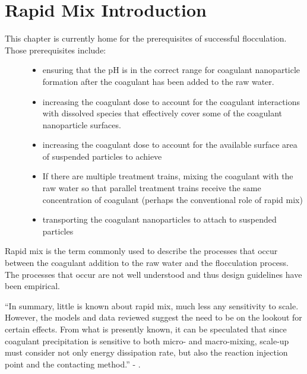 \documentclass[letterpaper,10pt,english]{sphinxmanual}
\begin{document}
\chapter{Rapid Mix Introduction}
\label{\detokenize{Rapid_Mix/RM_Intro:rapid-mix-introduction}}\label{\detokenize{Rapid_Mix/RM_Intro:title-rapid-mix-introduction}}\label{\detokenize{Rapid_Mix/RM_Intro::doc}}\begin{description}
\item[{This chapter is currently home for the prerequisites of successful flocculation. Those prerequisites include:}] \leavevmode\begin{itemize}
\item {} 
ensuring that the pH is in the correct range for coagulant nanoparticle formation after the coagulant has been added to the raw water.

\item {} 
increasing the coagulant dose to account for the coagulant interactions with dissolved species that effectively cover some of the coagulant nanoparticle surfaces.

\item {} 
increasing the coagulant dose to account for the available surface area of suspended particles to achieve

\item {} 
If there are multiple treatment trains, mixing the coagulant with the raw water so that parallel treatment trains receive the same concentration of coagulant (perhaps the conventional role of rapid mix)

\item {} 
transporting the coagulant nanoparticles to attach to suspended particles

\end{itemize}

\end{description}

Rapid mix is the term commonly used to describe the processes that occur between the coagulant addition to the raw water and the flocculation process. The processes that occur are not well understood and thus design guidelines have been empirical.

“In summary, little is known about rapid mix, much less any sensitivity to scale. However, the models and data reviewed suggest the need to be on the lookout for certain effects. From what is presently known, it can be speculated that since coagulant precipitation is sensitive to both micro- and macro-mixing, scale-up must consider not only energy dissipation rate, but also the reaction injection point and the contacting method.” - .
\end{document}
